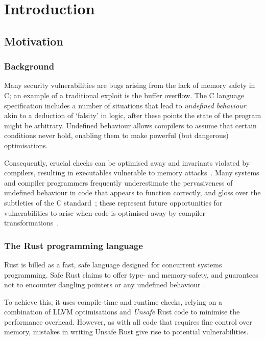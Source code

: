 \documentclass[dissertation.tex]{subfiles}
\begin{document}
\chapter{Introduction}
\label{ch:intro}

\section{Motivation}
\label{sec:intro-motiv}

\subsection{Background}
Many security vulnerabilities are bugs arising from the lack of memory safety in C; an example of a traditional exploit is the buffer overflow.
The C language specification includes a number of situations that lead to \emph{undefined behaviour}: akin to a deduction of `falsity' in logic, after these points the state of the program might be arbitrary.
Undefined behaviour allows compilers to assume that certain conditions never hold, enabling them to make powerful (but dangerous) optimisations.

Consequently, crucial checks can be optimised away and invariants violated by compilers, resulting in executables vulnerable to memory attacks~\cite{simon2018wygiwyc}.
Many systems and compiler programmers frequently underestimate the pervasiveness of undefined behaviour in code that appears to function correctly, and gloss over the subtleties of the C standard~\cite{memarian2016cdepths};
these represent future opportunities for vulnerabilities to arise when code is optimised away by compiler transformations~\cite{wang2013towards}.


\subsection{The Rust programming language}


Rust is billed as a fast, safe language designed for concurrent systems
programming.
Safe Rust claims to offer type- and memory-safety, and guarantees not to
encounter dangling pointers or any undefined
behaviour~\cite{rust-nomicon-safe-unsafe}.

To achieve this, it uses compile-time and runtime checks, relying on a
combination of LLVM optimisations and \emph{Unsafe} Rust code to
minimise the performance overhead.
However, as with all code that requires fine control over memory,
mistakes in writing Unsafe Rust give rise to potential vulnerabilities.
\end{document}
